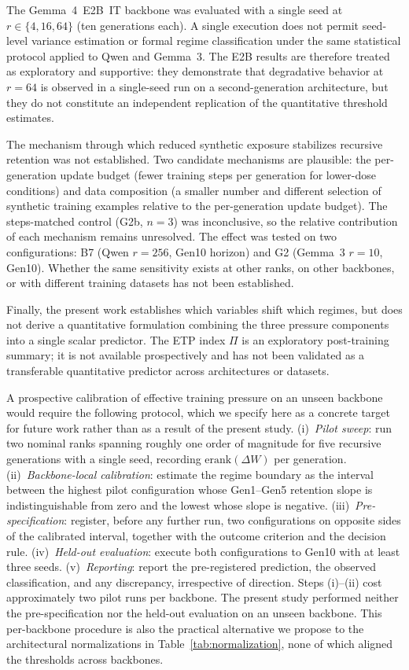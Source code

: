 \documentclass[a4paper,fleqn]{cas-dc}
\newif\ifshowchanges
\newcommand{\rev}[1]{\ifshowchanges{\color{blue}#1}\else{#1}\fi}
\begin{document}
\rev{The Gemma~4~E2B~IT backbone was evaluated with a single seed at $r \in \{4, 16, 64\}$
(ten generations each). A single execution does not permit
seed-level variance estimation or formal regime classification under the
same statistical protocol applied to Qwen and Gemma~3. The E2B results are
therefore treated as exploratory and supportive: they demonstrate that degradative behavior at $r=64$ is \rev{observed in a single-seed run} on a second-generation
architecture, but they do not constitute an independent replication of the
quantitative threshold estimates.}

\rev{The mechanism through which reduced synthetic exposure {stabilizes}
recursive retention was not established. Two candidate mechanisms are
plausible: the per-generation update budget (fewer training steps per
generation for lower-dose conditions) and data composition (\rev{a smaller number and different selection of synthetic training examples}
relative to the per-generation update budget). The
steps-matched control (G2b, $n=3$) was inconclusive, so the
relative contribution of each mechanism remains unresolved. The effect
was tested on two configurations: B7 (Qwen $r=256$, Gen10
horizon) and G2 (Gemma~3 $r=10$, Gen10). Whether the same sensitivity exists at other
ranks, on other backbones, or with different training datasets
has not been established.}

Finally, the present work establishes which variables shift which
regimes, but does not derive a quantitative formulation combining the
three pressure components into a single scalar predictor.
\rev{The ETP index $\Pi$ is an exploratory post-training summary; it is not
available prospectively and has not been validated as a transferable
quantitative predictor across architectures or datasets.}



\rev{A prospective calibration of effective training pressure on an
unseen backbone would require the following protocol, which we specify
here as a concrete target for future work rather than as a result of the
present study. (i)~\emph{Pilot sweep}: run two nominal ranks spanning
roughly one order of magnitude for five recursive generations with a
single seed, recording $\mathrm{erank}(\Delta W)$ per generation.
(ii)~\emph{Backbone-local calibration}: estimate the regime boundary as
the interval between the highest pilot configuration whose Gen1--Gen5
retention slope is indistinguishable from zero and the lowest whose
slope is negative. (iii)~\emph{Pre-specification}: register, before any
further run, two configurations on opposite sides of the calibrated
interval, together with the outcome criterion and the decision rule.
(iv)~\emph{Held-out evaluation}: execute both configurations to Gen10
with at least three seeds. (v)~\emph{Reporting}: report the
pre-registered prediction, the observed classification, and any
discrepancy, irrespective of direction. Steps (i)--(ii) cost
approximately two pilot runs per backbone. The present study performed
neither the pre-specification nor the held-out evaluation on an unseen
backbone. This per-backbone procedure is also the practical alternative
we propose to the architectural normalizations in
Table~\ref{tab:normalization}, none of which aligned the thresholds
across backbones.}
\end{document}
